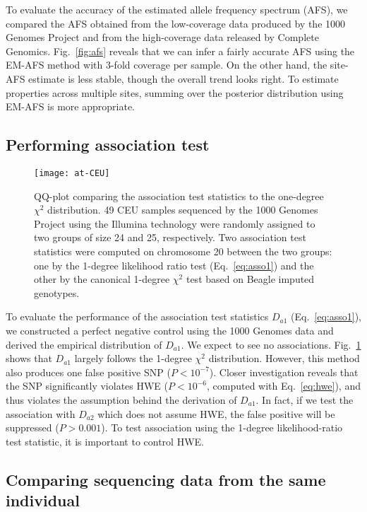 \documentclass{bioinfo}
\begin{document}
To evaluate the accuracy of the estimated allele frequency spectrum (AFS), we
compared the AFS obtained from the low-coverage data produced by the 1000
Genomes Project and from the high-coverage data released by Complete Genomics.
Fig.~\ref{fig:afs} reveals that we can infer a fairly accurate AFS using the
EM-AFS method with 3-fold coverage per sample. On the other hand, the site-AFS
estimate is less stable, though the overall trend looks right. To estimate
properties across multiple sites, summing over the posterior distribution using EM-AFS is
more appropriate.

\subsection{Performing association test}
\begin{figure}[tb]
\centering
\texttt{[image: at-CEU]}
\caption{QQ-plot comparing the association test statistics to the one-degree
$\chi^2$ distribution.
49 CEU samples sequenced by the 1000 Genomes Project using the Illumina
technology were randomly assigned to two groups of size 24 and 25,
respectively.  Two association test statistics were computed on chromosome 20
between the two groups: one by the 1-degree likelihood ratio test (Eq.~\ref{eq:asso1}) and the other
by the canonical 1-degree $\chi^2$ test based on Beagle imputed
genotypes.}\label{fig:at}
\end{figure}

To evaluate the performance of the association test statistics $D_{a1}$
(Eq.~\ref{eq:asso1}), we constructed a perfect negative control using the
1000 Genomes data and derived the empirical distribution of $D_{a1}$.
We expect to see no associations.
Fig.~\ref{fig:at} shows that $D_{a1}$ largely follows the 1-degree $\chi^2$
distribution.  However, this method also produces one false positive SNP
($P<10^{-7}$). Closer investigation reveals that the SNP significantly violates
HWE ($P<10^{-6}$, computed with Eq.~\eqref{eq:hwe}), and thus violates the
assumption behind the derivation of $D_{a1}$.  In fact, if we test the
association with $D_{a2}$ which does not assume HWE, the false positive will be
suppressed ($P>0.001$). To test association using the 1-degree likelihood-ratio
test statistic, it is important to control HWE.

\subsection{Comparing sequencing data from the same individual}
\end{document}
